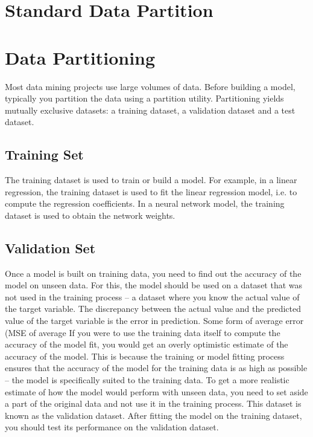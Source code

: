 \documentclass[a4paper,12pt]{article}
\begin{document}
\newpage

\section{Standard Data Partition}


\section{Data Partitioning}
Most data mining projects use large volumes of data. Before building a model, typically you partition the data using a partition utility. Partitioning yields mutually exclusive datasets: a training dataset, a validation dataset and a test dataset.
\subsection*{Training Set}
The training dataset is used to train or build a model. For example, in a linear regression, the training dataset is used to fit the linear regression model, i.e. to compute the regression coefficients. In a neural network model, the training dataset is used to obtain the network weights.
\subsection*{Validation Set}
Once a model is built on training data, you need to find out the accuracy of the model on unseen data. For this, the model should be used on a dataset that was not used in the training process -- a dataset where you know the actual value of the target variable. The discrepancy between the actual value and the predicted value of the target variable is the error in prediction. Some form of average error (MSE of average %
If you were to use the training data itself to compute the accuracy of the model fit, you would get an overly optimistic estimate of the accuracy of the model. This is because the training or model fitting process ensures that the accuracy of the model for the training data is as high as possible -- the model is specifically suited to the training data. To get a more realistic estimate of how the model would perform with unseen data, you need to set aside a part of the original data and not use it in the training process. This dataset is known as the validation dataset. After fitting the model on the training dataset, you should test its performance on the validation dataset.
\end{document}
